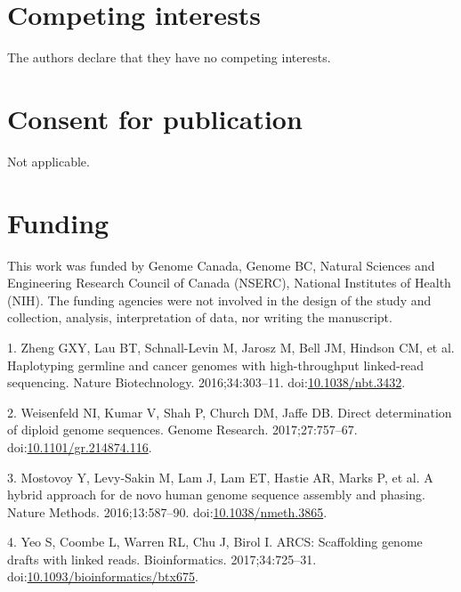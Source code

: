 \documentclass{bmcart}
\begin{document}
\begin{backmatter}
{\section*{Competing interests}\label{competing-interests}}

The authors declare that they have no competing interests.

\hypertarget{consent-for-publication}{%
\section*{Consent for publication}\label{consent-for-publication}}

Not applicable.

\hypertarget{funding}{%
\section*{Funding}\label{funding}}

This work was funded by Genome Canada, Genome BC, Natural Sciences and Engineering Research Council of Canada (NSERC), National Institutes of Health (NIH). The funding agencies were not involved in the design of the study and collection, analysis, interpretation of data, nor writing the manuscript.

\begin{thebibliography}{}
\end{thebibliography}

\hypertarget{refs}{}
\leavevmode\hypertarget{ref-Zheng_2016}{}%
1. Zheng GXY, Lau BT, Schnall-Levin M, Jarosz M, Bell JM, Hindson CM, et al. Haplotyping germline and cancer genomes with high-throughput linked-read sequencing. Nature Biotechnology. 2016;34:303--11. doi:\href{https://doi.org/10.1038/nbt.3432}{10.1038/nbt.3432}.

\leavevmode\hypertarget{ref-Weisenfeld_2017}{}%
2. Weisenfeld NI, Kumar V, Shah P, Church DM, Jaffe DB. Direct determination of diploid genome sequences. Genome Research. 2017;27:757--67. doi:\href{https://doi.org/10.1101/gr.214874.116}{10.1101/gr.214874.116}.

\leavevmode\hypertarget{ref-Mostovoy_2016}{}%
3. Mostovoy Y, Levy-Sakin M, Lam J, Lam ET, Hastie AR, Marks P, et al. A hybrid approach for de novo human genome sequence assembly and phasing. Nature Methods. 2016;13:587--90. doi:\href{https://doi.org/10.1038/nmeth.3865}{10.1038/nmeth.3865}.

\leavevmode\hypertarget{ref-Yeo_2017}{}%
4. Yeo S, Coombe L, Warren RL, Chu J, Birol I. ARCS: Scaffolding genome drafts with linked reads. Bioinformatics. 2017;34:725--31. doi:\href{https://doi.org/10.1093/bioinformatics/btx675}{10.1093/bioinformatics/btx675}.


\end{backmatter}
\end{document}
